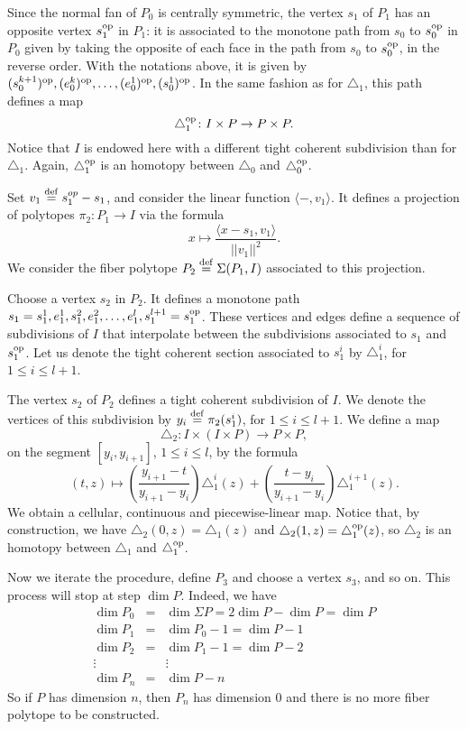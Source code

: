 Since the normal fan of $P_0$ is centrally symmetric, the vertex $s_1$ of $P_1$ has an opposite vertex $s_1^{\mathrm{op}}$ in $P_1$: it is associated to the monotone path from $s_0$ to $s_0^{\mathrm{op}}$ in $P_0$ given by taking the opposite of each face in the path from $s_0$ to $s^{\mathrm{op}}_0$, in the reverse order.
With the notations above, it is given by $(s_0^{k+1})^{\mathrm{op}},(e_0^k)^{\mathrm{op}},\ldots,(e_0^1)^{\mathrm{op}},(s_0^1)^{\mathrm{op}}$.
In the same fashion as for $\triangle_1$, this path defines a map
\[
\triangle_1^{\mathrm{op}} \colon I \times P \to P \times P.
\]
Notice that $I$ is endowed here with a different tight coherent subdivision than for $\triangle_1$.
Again, $\triangle_1^{\mathrm{op}}$ is an homotopy between $\triangle_0$ and $\triangle_0^{\mathrm{op}}$.

Set $v_1 \stackrel{\mathrm{def}}{=} s_1^{op}-s_1$, and consider the linear function $\langle - , v_1 \rangle$.
It defines a projection of polytopes $\pi_2 \colon P_1 \to I$ via the formula
\[
x \mapsto \frac{\langle x-s_1, v_1 \rangle}{||v_1||^2}.
\]
We consider the fiber polytope $P_2 \stackrel{\mathrm{def}}{=} \Sigma(P_1,I)$ associated to this projection.

Choose a vertex $s_2$ in $P_2$. It defines a monotone path $s_1 = s_1^1, e_1^1, s_1^2, e_1^2, \dots, e_1^l, s_1^{l+1} = s^{\mathrm{op}}_1$.
These vertices and edges define a sequence of subdivisions of $I$ that interpolate between the subdivisions associated to $s_1$ and $s_1^{\mathrm{op}}$.
Let us denote the tight coherent section associated to $s_1^i$ by $\triangle_1^i$, for $1\leq i \leq l+1$.

The vertex $s_2$ of $P_2$ defines a tight coherent subdivision of $I$.
We denote the vertices of this subdivision by $y_i \stackrel{\mathrm{def}}{=} \pi_2(s_1^i)$, for $1 \leq i \leq l+1$.
We define a map
\[
\triangle_2 \colon I \times (I \times P) \to P \times P,
\]
on the segment $[y_i,y_{i+1}]$, $1 \leq i \leq l$, by the formula
\[
(t,z) \mapsto \left(\frac{y_{i+1}-t}{y_{i+1}-y_i}\right)\triangle_1^{i}(z)+\left(\frac{t-y_{i}}{y_{i+1}-y_i}\right)\triangle_1^{i+1}(z).
\]
We obtain a cellular, continuous and piecewise-linear map.
Notice that, by construction, we have $\triangle_2(0,z)=\triangle_1(z)$ and $\triangle_2(1,z)=\triangle_1^{\mathrm{op}}(z)$, so $\triangle_2$ is an homotopy between $\triangle_1$ and $\triangle_1^{\mathrm{op}}$.

Now we iterate the procedure, define $P_3$ and choose a vertex $s_3$, and so on.
This process will stop at step $\dim P$.
Indeed, we have
\begin{eqnarray*}
    \dim P_0 & = & \dim \Sigma P = 2 \dim P - \dim P = \dim P \\
    \dim P_1 & = & \dim P_0 -1 = \dim P -1 \\
    \dim P_2 & = & \dim P_1 - 1 = \dim P -2 \\
    \vdots & & \vdots  \\
    \dim P_n & = &\dim P - n
\end{eqnarray*}
So if $P$ has dimension $n$, then $P_n$ has dimension 0 and there is no more fiber polytope to be constructed.

